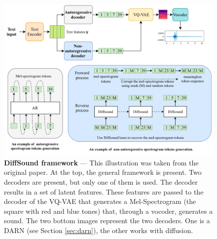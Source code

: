 \begin{figure}[ht]
    \centering
    \includegraphics[width=\textwidth]{figures/2-sota/diffsound.png}
    \caption[DiffSound framework]{\textbf{DiffSound framework} --- This illustration was taken from the original paper. At the top, the general framework is present. Two decoders are present, but only one of them is used. The decoder results in a set of latent features. These features are passed to the decoder of the \ac{VQ-VAE} that generates a Mel-Spectrogram (the square with red and blue tones) that, through a vocoder, generates a sound. The two bottom images represent the two decoders. One is a \ac{DARN} (see Section \ref{sec:darn}), the other works with diffusion.}
    \label{fig:diffsound}
\end{figure}